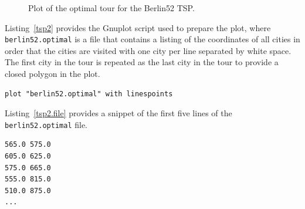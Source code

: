 \begin{figure}[htp]
\centering

\caption{Plot of the optimal tour for the Berlin52 TSP.}
\label{plot:tsp2}
\end{figure}

Listing~\ref{tsp2} provides the Gnuplot script used to prepare the plot, where \texttt{berlin52.optimal} is a file that contains a listing of the coordinates of all cities in order that the cities are visited with one city per line separated by white space. The first city in the tour is repeated as the last city in the tour to provide a closed polygon in the plot.

\begin{lstlisting}[caption=Gnuplot script for plotting a tour for a TSP., label=tsp2]
plot "berlin52.optimal" with linespoints
\end{lstlisting}

Listing~\ref{tsp2.file} provides a snippet of the first five lines of the \texttt{berlin52.optimal} file.

\begin{lstlisting}[caption=Snippet of the \texttt{berlin52.optimal} file., label=tsp2.file]
565.0 575.0
605.0 625.0
575.0 665.0
555.0 815.0
510.0 875.0
...
\end{lstlisting}
